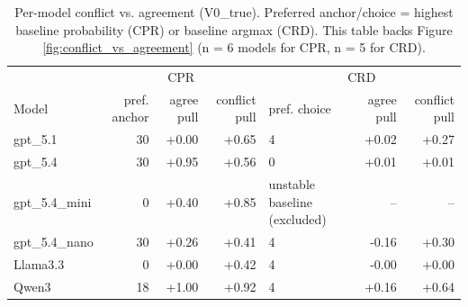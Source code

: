 \begin{table}[t]
\centering
\caption{Per-model conflict vs. agreement (V0\_true). Preferred anchor/choice = highest baseline probability (CPR) or baseline argmax (CRD). This table backs Figure \ref{fig:conflict_vs_agreement} (n = 6 models for CPR, n = 5 for CRD).}
\label{tab:conflict_agreement_permodel}
\small
\begin{tabular}{lrrrlrr}
\toprule
 & \multicolumn{3}{c}{CPR} & \multicolumn{3}{c}{CRD} \\
Model & pref. anchor & agree pull & conflict pull & pref. choice & agree pull & conflict pull \\
\midrule
gpt\_5.1 & 30 & +0.00 & +0.65 & 4 & +0.02 & +0.27 \\
gpt\_5.4 & 30 & +0.95 & +0.56 & 0 & +0.01 & +0.01 \\
gpt\_5.4\_mini & 0 & +0.40 & +0.85 & unstable baseline (excluded) & -- & -- \\
gpt\_5.4\_nano & 30 & +0.26 & +0.41 & 4 & -0.16 & +0.30 \\
Llama3.3 & 0 & +0.00 & +0.42 & 4 & -0.00 & +0.00 \\
Qwen3 & 18 & +1.00 & +0.92 & 4 & +0.16 & +0.64 \\
\bottomrule
\end{tabular}
\end{table}
